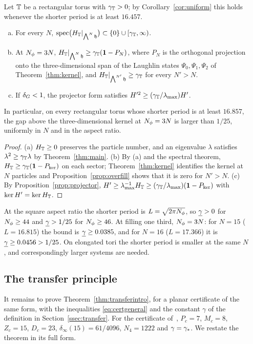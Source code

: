 \begin{corollary}\label{cor:spectrum}
Let $\mathbb{T}$ be a rectangular torus with $\gamma_{\mathbb{T}}>0$; by Corollary~\ref{cor:uniform} this holds whenever the shorter period is at least
$16.457$.
\begin{enumerate}[(a)]
\item For every $N$, $\operatorname{spec}\bigl(H_{\mathbb{T}}|_{\bigwedge^N\mathfrak{h}}\bigr)\subset\{0\}\cup[\gamma_{\mathbb{T}},\infty)$.
\item At $N_{\phi}=3N$, $H_{\mathbb{T}}|_{\bigwedge^N\mathfrak{h}}\ge\gamma_{\mathbb{T}}(\mathbf{1}-P_N)$, where $P_N$ is the orthogonal projection onto the three-dimensional span of the
Laughlin states $\Psi_0,\Psi_1,\Psi_2$ of Theorem~\ref{thm:kernel}, and $H_{\mathbb{T}}|_{\bigwedge^{N'}\mathfrak{h}}\ge\gamma_{\mathbb{T}}$ for every $N'>N$.
\item If $\delta_G<1$, the projector form satisfies $H'^2\ge(\gamma_{\mathbb{T}}/\lambda_{\max})H'$.
\end{enumerate}
In particular, on every rectangular torus whose shorter period is at least $16.857$, the gap above the three-dimensional kernel at
$N_{\phi}=3N$ is larger than $1/25$, uniformly in $N$ and in the aspect ratio.
\end{corollary}

\begin{proof}
(a) $H_{\mathbb{T}}\ge0$ preserves the particle number, and an eigenvalue $\lambda$ satisfies $\lambda^2\ge\gamma_{\mathbb{T}}\lambda$ by Theorem~\ref{thm:main}.
(b) By (a) and the spectral theorem, $H_{\mathbb{T}}\ge\gamma_{\mathbb{T}}(\mathbf{1}-P_{\ker})$ on each sector; Theorem~\ref{thm:kernel} identifies the kernel at
$N$ particles and Proposition~\ref{prop:overfill} shows that it is zero for $N'>N$. (c) By Proposition~\ref{prop:projector},
$H'\ge\lambda_{\max}^{-1}H_{\mathbb{T}}\ge(\gamma_{\mathbb{T}}/\lambda_{\max})(\mathbf{1}-P_{\ker})$ with $\ker H'=\ker H_{\mathbb{T}}$.
\end{proof}

At the square aspect ratio the shorter period is $L=\sqrt{2\pi N_{\phi}}$, so $\underline{\gamma}>0$ for $N_{\phi}\ge44$ and $\underline{\gamma}>1/25$ for $N_{\phi}\ge46$.
At filling one third, $N_{\phi}=3N$: for $N=15$ ($L=16.815$) the bound is $\underline{\gamma}\ge0.0385$, and for $N=16$ ($L=17.366$) it is
$\underline{\gamma}\ge0.0456>1/25$. On elongated tori the shorter period is smaller at the same $N$, and correspondingly larger systems are
needed.

\subsection{The transfer principle}\label{ssec:transferproof}

It remains to prove Theorem~\ref{thm:transferintro}, for a planar certificate of the same form, with the inequalities
\eqref{eq:certgeneral} and the constant $\gamma$ of the definition in Section~\ref{ssec:transfer}. For the certificate
of~\cite{OAI:A-Fock-space-inequality-and-the-Laughlin-spectral-gap-September-24-2026}, $P_c=7$, $M_c=8$, $Z_c=15$, $D_c=23$,
$\delta_\infty(15)=61/4096$, $N_4=1222$ and $\gamma=\gamma_{*}$. We restate the theorem in its full form.

